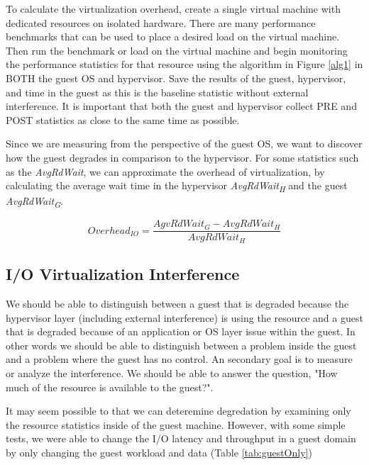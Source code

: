 To calculate the virtualization overhead, create a single virtual machine with dedicated resources on isolated hardware.  
There are many performance benchmarks that can be used \cite{katcher, tikotekar, hplBench} to place a desired load on the virtual machine. 
Then run the benchmark or load on the virtual machine and begin monitoring the performance statistics for that resource using the algorithm in Figure \ref{alg1} in BOTH the guest OS and hypervisor. 
Save the results of the guest, hypervisor, and time in the guest as this is the baseline statistic without external interference.
It is important that both the guest and hypervisor collect PRE and POST statistics as close to the same time as possible.  

Since we are measuring from the perspective of the guest OS, we want to discover how the guest degrades in comparison to the hypervisor.  
For some statistics such as the \emph{AvgRdWait}, we can approximate the overhead of virtualization, by calculating the average wait time in the hypervisor \emph{AvgRdWait\textsubscript{H}} and the guest \emph{AvgRdWait\textsubscript{G}}.

\begin{equation}
  Overhead_{IO} = \frac{AgvRdWait_G - AvgRdWait_H}{AvgRdWait_H} 
\end{equation}

\subsection{I/O Virtualization Interference}
We should be able to distinguish between a guest that is degraded because the hypervisor layer (including external interference) is using the resource and a guest that is degraded because of an application or OS layer issue within the guest.  In other words we should be able to distinguish between a problem inside the guest and a problem where the guest has no control.  An secondary goal is to measure or analyze the interference.  We should be able to answer the question, "How much of the resource is available to the guest?".

It may seem possible to that we can deteremine degredation by examining only the resource statistics inside of the guest machine.  However, with some simple tests, we were able to change the I/O latency and throughput in a guest domain by only changing the guest workload and data (Table \ref{tab:guestOnly})
 
